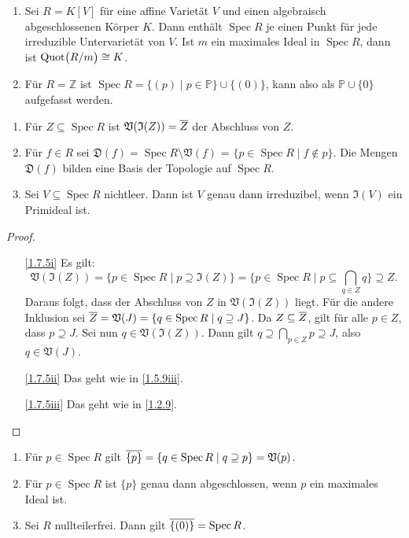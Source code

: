 \documentclass[a4paper,12pt]{scrbook}
\newtheorem{proof}{Beweis}
\def\V{\mathfrak{V}}
\def\I{\mathfrak{I}}
\def\P{\mathbb{P}}
\newcommand{\D}{\mathfrak{D}}
\newcommand{\Spec}{\operatorname{Spec}}
\newcommand{\Quot}{\mathrm{Quot}}
\newcommand{\set}[1]{\ensuremath{\mathbb{#1}}}
\newcommand{\Z}{\set{Z}}
\def\Bar#1{\ensuremath\overline{#1}}
\newcommand{\Quotient}[2]{
  \mathchoice
  { %
    \raisebox{0.7ex}{\ensuremath{#1}}
    \ensuremath{\mkern-3mu}\big/\ensuremath{\mkern-3mu}
    \raisebox{-0.6ex}{\ensuremath{#2}}
  }
  { %
    #1/#2
  }
  { %
    #1/#2
  }
  { %
    #1/#2
  }
}
\begin{document}
\begin{bsp}\label{1.7.4}
  \begin{enumerate}
  \item{} Sei $R=K[V]$ für eine affine Varietät $V$ und einen algebraisch abgeschlossenen Körper $K$. Dann enthält
    $\Spec R$ je einen Punkt für jede irreduzible Untervarietät von $V$. Ist $m$ ein maximales Ideal in $\Spec R$, dann ist
    $\Quot\bigl(\Quotient{R}{m}\bigr)\cong K$.
  \item{} Für $R=\Z$ ist $\Spec R = \{(p)\mid p\in\P\}\cup\{(0)\}$, kann also als $\P\cup\{0\}$ aufgefasst werden.
  \end{enumerate}
\end{bsp}

\begin{bem}\label{1.7.5}
  \begin{enumerate}
  \item{} Für $Z\subseteq\Spec R$ ist $\V(\I(Z))=\Bar{Z}$ der Abschluss von $Z$.
  \item{} Für $f\in R$ sei $\D(f)=\Spec R\setminus\V(f)$ = $\{p\in\Spec R\mid f\notin p\}$. Die Mengen $\D(f)$
    bilden eine Basis der Topologie auf $\Spec R$.
  \item{} Sei $V\subseteq\Spec R$ nichtleer. Dann ist $V$ genau dann irreduzibel, wenn $\I(V)$ ein Primideal ist.
  \end{enumerate}
\end{bem}
\begin{proof}
  \begin{enumerate}
  \item[\ref{1.7.5i}] Es gilt:\vspace*{-6pt}
  \[\V(\I(Z))=\{p\in\Spec R\mid p\supseteq\I(Z)\} = \{p\in\Spec R\mid p\subseteq\bigcap_{q\in Z}q\}\supseteq Z.\]
    Daraus folgt, dass der Abschluss von $Z$ in $\V(\I(Z))$ liegt. Für die andere Inklusion sei
    $\Bar{Z}=\V(J)=\{q\in\Spec R\mid q\supseteq J\}$. Da $Z\subseteq\Bar{Z}$, gilt für alle $p\in Z$, dass $p\supseteq J$. Sei
    nun $q\in\V(\I(Z))$. Dann gilt $q\supseteq\bigcap_{p\in Z}p\supseteq J$, also $q\in\V(J)$.
  \item[\ref{1.7.5ii}] Das geht wie in \cref{1.5.9iii}.
  \item[\ref{1.7.5iii}] Das geht wie in \cref{1.2.9}.
  \end{enumerate}
\end{proof}

\begin{bem}\label{1.7.6}
  \begin{enumerate}
  \item{} Für $p\in\Spec R$ gilt $\Bar{\{p\}}=\{q\in\Spec R\mid q\supseteq p\}=\V(p)$.
  \item{} Für $p\in\Spec R$ ist $\{p\}$ genau dann abgeschlossen, wenn $p$ ein maximales Ideal ist.
  \item{} Sei $R$ nullteilerfrei. Dann gilt $\Bar{\{(0)\}}=\Spec R$.
  \end{enumerate}
\end{bem}
\end{document}
